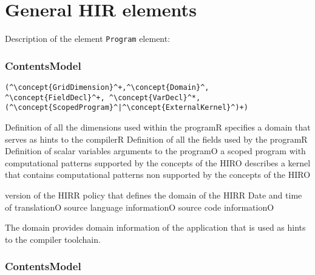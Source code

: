 \section{General HIR elements}


Description of the element {\tt Program} element:

\subsubsection*{ContentsModel}{}

\begin{lstlisting}[style=default,frame=none]
(^\concept{GridDimension}^+,^\concept{Domain}^, ^\concept{FieldDecl}^+, ^\concept{VarDecl}^*, (^\concept{ScopedProgram}^|^\concept{ExternalKernel}^)+)
\end{lstlisting}

\begin{HIRChildElements}
{Definition of all the dimensions used within the program}{R}
{specifies a domain that serves as hints to the compiler}{R}
{Definition of all the fields used by the program}{R}
{Definition of scalar variables arguments to the program}{O}
{a scoped program with computational patterns supported by the concepts of the HIR}{O}
{describes a kernel that contains computational patterns non supported by the concepts of the HIR}{O}
\end{HIRChildElements}

\begin{HIRAttributes}
{version of the HIR}{R}
{policy that defines the domain of the HIR}{R}
{Date and time of translation}{O}
{source language information}{O}
{source code information}{O}
\end{HIRAttributes}


The domain provides domain information of the application that is used as hints to the compiler toolchain.

\subsubsection*{ContentsModel}{}

